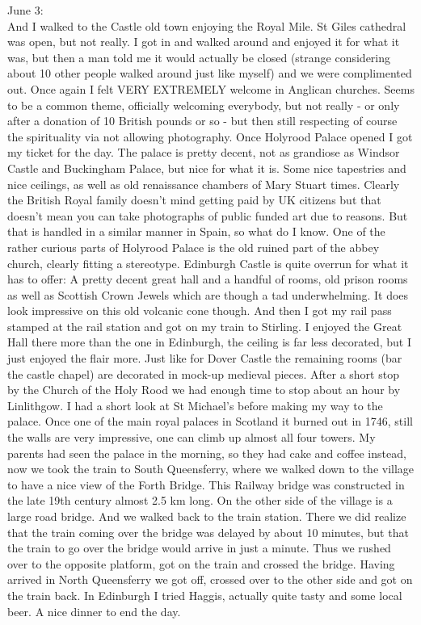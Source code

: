 June 3:\\
And I walked to the Castle old town enjoying the Royal Mile. St Giles cathedral was open, but not really. I got in and walked around and enjoyed it for what it was, but then a man told me it would actually be closed (strange considering about 10 other people walked around just like myself) and we were complimented out. Once again I felt VERY EXTREMELY welcome in Anglican churches. Seems to be a common theme, officially welcoming everybody, but not really - or only after a donation of 10 British pounds or so - but then still respecting of course the spirituality via not allowing photography. Once Holyrood Palace opened I got my ticket for the day. The palace is pretty decent, not as grandiose as Windsor Castle and Buckingham Palace, but nice for what it is. Some nice tapestries and nice ceilings, as well as old renaissance chambers of Mary Stuart times. Clearly the British Royal family doesn't mind getting paid by UK citizens but that doesn't mean you can take photographs of public funded art due to reasons. But that is handled in a similar manner in Spain, so what do I know. One of the rather curious parts of Holyrood Palace is the old ruined part of the abbey church, clearly fitting a stereotype. Edinburgh Castle is quite overrun for what it has to offer: A pretty decent great hall and a handful of rooms, old prison rooms as well as Scottish Crown Jewels which are though a tad underwhelming. It does look impressive on this old volcanic cone though. And then I got my rail pass stamped at the rail station and got on my train to Stirling. I enjoyed the Great Hall there more than the one in Edinburgh, the ceiling is far less decorated, but I just enjoyed the flair more. Just like for Dover Castle the remaining rooms (bar the castle chapel) are decorated in mock-up medieval pieces. After a short stop by the Church of the Holy Rood we had enough time to stop about an hour by Linlithgow. I had a short look at St Michael's before making my way to the palace. Once one of the main royal palaces in Scotland it burned out in 1746, still the walls are very impressive, one can climb up almost all four towers. My parents had seen the palace in the morning, so they had cake and coffee instead, now we took the train to South Queensferry, where we walked down to the village to have a nice view of the Forth Bridge. This Railway bridge was constructed in the late 19th century almost 2.5 km long. On the other side of the village is a large road bridge. And we walked back to the train station. There we did realize that the train coming over the bridge was delayed by about 10 minutes, but that the train to go over the bridge would arrive in just a minute. Thus we rushed over to the opposite platform, got on the train and crossed the bridge. Having arrived in North Queensferry we got off, crossed over to the other side and got on the train back. In Edinburgh I tried Haggis, actually quite tasty and some local beer. A nice dinner to end the day.\\

